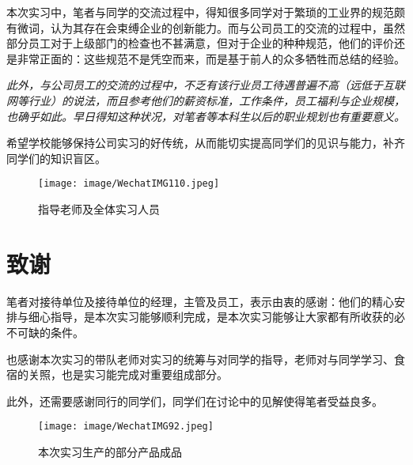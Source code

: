 本次实习中，笔者与同学的交流过程中，得知很多同学对于繁琐的工业界的规范颇有微词，认为其存在会束缚企业的创新能力。而与公司员工的交流的过程中，虽然部分员工对于上级部门的检查也不甚满意，但对于企业的种种规范，他们的评价还是非常正面的：这些规范不是凭空而来，而是基于前人的众多牺牲而总结的经验。

\textit{此外，与公司员工的交流的过程中，不乏有该行业员工待遇普遍不高（远低于互联网等行业）的说法，而且参考他们的薪资标准，工作条件，员工福利与企业规模，也确乎如此。早日得知这种状况，对笔者等本科生以后的职业规划也有重要意义。}

希望学校能够保持公司实习的好传统，从而能切实提高同学们的见识与能力，补齐同学们的知识盲区。

\begin{figure}[H]
    \centering
    \texttt{[image: image/WechatIMG110.jpeg]}
    \caption{指导老师及全体实习人员}
    \label{STAFF1}
\end{figure}
\section*{致谢} 

笔者对接待单位及接待单位的经理，主管及员工，表示由衷的感谢：他们的精心安排与细心指导，是本次实习能够顺利完成，是本次实习能够让大家都有所收获的必不可缺的条件。

也感谢本次实习的带队老师对实习的统筹与对同学的指导，老师对与同学学习、食宿的关照，也是实习能完成对重要组成部分。

此外，还需要感谢同行的同学们，同学们在讨论中的见解使得笔者受益良多。

\begin{figure}[H]
    \centering
    \texttt{[image: image/WechatIMG92.jpeg]}
    \caption{本次实习生产的部分产品成品}
    \label{STAFF2}
\end{figure}